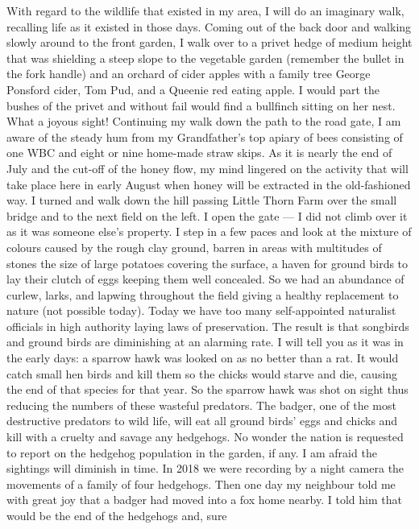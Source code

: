 With regard to the wildlife that existed in my area, I will do an imaginary
walk, recalling life as it existed in those days. Coming out of the back door
and walking slowly around to the front garden, I walk over to a privet hedge of
medium height that was shielding a steep slope to the vegetable garden
(remember the bullet in the fork handle) and an orchard of cider apples with a
family tree George Ponsford cider, Tom Pud, and a Queenie red eating apple. I
would part the bushes of the privet and without fail would find a bullfinch
sitting on her nest. What a joyous sight! Continuing my walk down the path to
the road gate, I am aware of the steady hum from my Grandfather's top apiary of
bees consisting of one WBC and eight or nine home-made straw skips. As it is
nearly the end of July and the cut-off of the honey flow, my mind lingered on
the activity that will take place here in early August when honey will be
extracted in the old-fashioned way. I turned and walk down the hill passing
Little Thorn Farm over the small bridge and to the next field on the left. I
open the gate --- I did not climb over it as it was someone else's property. I
step in a few paces and look at the mixture of colours caused by the rough clay
ground, barren in areas with multitudes of stones the size of large potatoes
covering the surface, a haven for ground birds to lay their clutch of eggs
keeping them well concealed. So we had an abundance of curlew, larks, and
lapwing throughout the field giving a healthy replacement to nature
(not possible today). Today we have too many self-appointed naturalist
officials in high authority laying laws of preservation. The result is that
songbirds and ground birds are diminishing at an alarming rate. I will tell you
as it was in the early days: a sparrow hawk was looked on as no better than a
rat. It would catch small hen birds and kill them so the chicks would starve
and die, causing the end of that species for that year. So the sparrow hawk was
shot on sight thus reducing the numbers of these wasteful predators. The
badger, one of the most destructive predators to wild life, will eat all ground
birds' eggs and chicks and kill with a cruelty and savage any hedgehogs. No
wonder the nation is requested to report on the hedgehog population in the
garden, if any. I am afraid the sightings will diminish in time. In 2018 we
were recording by a night camera the movements of a family of four hedgehogs.
Then one day my neighbour told me with great joy that a badger had moved into a
fox home nearby. I told him that would be the end of the hedgehogs and, sure
